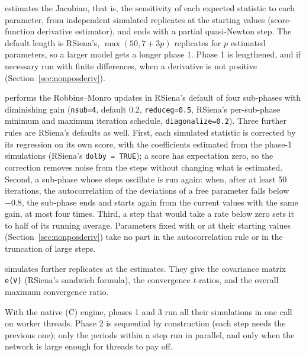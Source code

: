 \begin{description}[leftmargin=0pt,labelindent=0pt]
\item[Phase 1] estimates the Jacobian, that is, the sensitivity of each expected statistic to each parameter, from  independent simulated replicates at the starting values (score-function derivative estimator), and ends with a partial quasi-Newton step. The default length is RSiena's, $\max(50, 7+3p)$ replicates for $p$ estimated parameters, so a larger model gets a longer phase 1. Phase 1 is lengthened, and if necessary run with finite differences, when a derivative is not positive (Section~\ref{sec:nonposderiv}).
\item[Phase 2] performs the Robbins--Monro updates in RSiena's default of four sub-phases with diminishing gain (\texttt{nsub=4},  default 0.2, \texttt{reduceg=0.5}, RSiena's per-sub-phase minimum and maximum iteration schedule, \texttt{diagonalize=0.2}). Three further rules are RSiena's defaults as well. First, each simulated statistic is corrected by its regression on its own score, with the coefficients estimated from the phase-1 simulations (RSiena's \texttt{dolby = TRUE}); a score has expectation zero, so the correction removes noise from the steps without changing what is estimated. Second, a sub-phase whose steps oscillate is run again: when, after at least 50 iterations, the autocorrelation of the deviations of a free parameter falls below $-0.8$, the sub-phase ends and starts again from the current values with the same gain, at most four times. Third, a step that would take a rate below zero sets it to half of its running average. Parameters fixed with  or at their starting values (Section~\ref{sec:nonposderiv}) take no part in the autocorrelation rule or in the truncation of large steps.
\item[Phase 3] simulates  further replicates at the estimates. They give the covariance matrix \texttt{e(V)} (RSiena's sandwich formula), the convergence $t$-ratios, and the overall maximum convergence ratio.
\end{description}
With the native (C) engine, phases 1 and 3 run all their simulations in one call on worker threads. Phase 2 is sequential by construction (each step needs the previous one); only the periods within a step run in parallel, and only when the network is large enough for threads to pay off.

